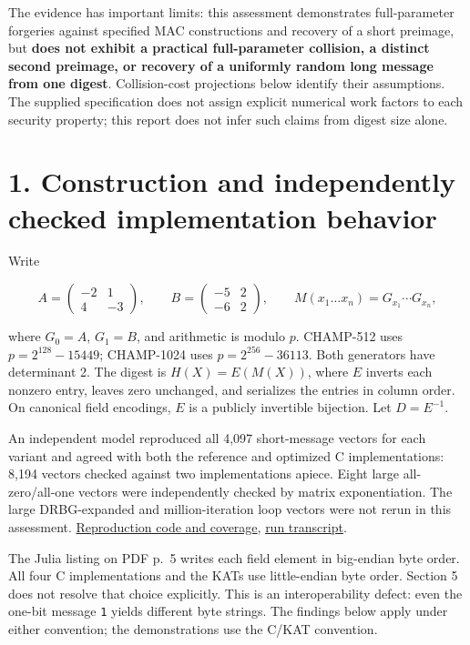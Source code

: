 \documentclass[
  english,
  11pt,
  a4paper,
]{article}
\begin{document}
The evidence has important limits: this assessment demonstrates
full-parameter forgeries against specified MAC constructions and
recovery of a short preimage, but \textbf{does not exhibit a practical
full-parameter collision, a distinct second preimage, or recovery of a
uniformly random long message from one digest}. Collision-cost
projections below identify their assumptions. The supplied specification
does not assign explicit numerical work factors to each security
property; this report does not infer such claims from digest size alone.



\section{1. Construction and independently checked implementation
behavior}\label{construction-and-independently-checked-implementation-behavior}


Write

\[
A=\begin{pmatrix}-2&1\\4&-3\end{pmatrix},\qquad
B=\begin{pmatrix}-5&2\\-6&2\end{pmatrix},\qquad
M(x_1\ldots x_n)=G_{x_1}\cdots G_{x_n},
\]

where \(G_0=A\), \(G_1=B\), and arithmetic is modulo \(p\). CHAMP-512
uses \(p=2^{128}-15449\); CHAMP-1024 uses \(p=2^{256}-36113\). Both
generators have determinant 2. The digest is \(H(X)=E(M(X))\), where
\(E\) inverts each nonzero entry, leaves zero unchanged, and serializes
the entries in column order. On canonical field encodings, \(E\) is a
publicly invertible bijection. Let \(D=E^{-1}\).

An independent model reproduced all 4,097 short-message vectors for each
variant and agreed with both the reference and optimized C
implementations: 8,194 vectors checked against two implementations
apiece. Eight large all-zero/all-one vectors were independently checked
by matrix exponentiation. The large DRBG-expanded and million-iteration
loop vectors were not rerun in this assessment.
\href{REPRODUCING.md}{Reproduction code and coverage},
\href{evidence/reproduce-full.log}{run transcript}.

The Julia listing on PDF p.~5 writes each field element in big-endian
byte order. All four C implementations and the KATs use little-endian
byte order. Section 5 does not resolve that choice explicitly. This is
an interoperability defect: even the one-bit message \texttt{1} yields
different byte strings. The findings below apply under either
convention; the demonstrations use the C/KAT convention.
\end{document}
